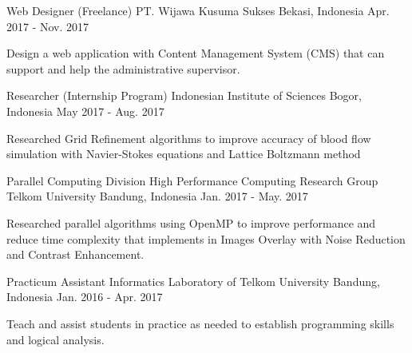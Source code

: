 \begin{cventries}

  \cventry
    {Web Designer (Freelance)} %
    {PT. Wijawa Kusuma Sukses} %
    {Bekasi, Indonesia} %
    {Apr. 2017 - Nov. 2017} %
    {
      \begin{cvitems} %
        \item {Design a web application with Content Management System (CMS) that can support and help the administrative supervisor.}
      \end{cvitems}
    }

  \cventry
    {Researcher (Internship Program)} %
    {Indonesian Institute of Sciences} %
    {Bogor, Indonesia} %
    {May 2017 - Aug. 2017} %
    {
      \begin{cvitems} %
        \item {Researched Grid Refinement algorithms to improve accuracy of blood flow simulation with Navier-Stokes equations and Lattice Boltzmann method}
      \end{cvitems}
    }

  \cventry
    {Parallel Computing Division} %
    {High Performance Computing Research Group Telkom University} %
    {Bandung, Indonesia} %
    {Jan. 2017 - May. 2017} %
    {
      \begin{cvitems} %
        \item {Researched parallel algorithms using OpenMP to improve performance and reduce time complexity that implements in Images Overlay with Noise Reduction and Contrast Enhancement.}
      \end{cvitems}
    }

  \cventry
    {Practicum Assistant} %
    {Informatics Laboratory of Telkom University} %
    {Bandung, Indonesia} %
    {Jan. 2016 - Apr. 2017} %
    {
      \begin{cvitems} %
        \item {Teach and assist students in practice as needed to establish programming skills and logical analysis.}
      \end{cvitems}
    }


\end{cventries}

